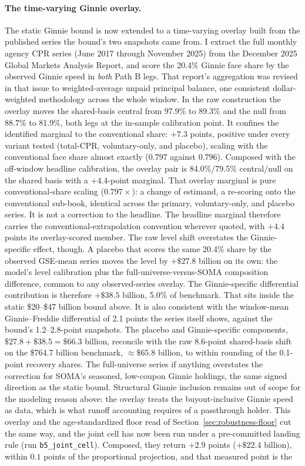 \documentclass[12pt]{article}
\begin{document}
\paragraph{The time-varying Ginnie overlay.}
The static Ginnie bound is now extended to a time-varying overlay built from the published series the bound's two snapshots came from. I extract the full monthly agency CPR series (June 2017 through November 2025) from the December 2025 Global Markets Analysis Report, and score the 20.4\% Ginnie face share by the observed Ginnie speed in \emph{both} Path B legs. That report's aggregation was revised in that issue to weighted-average unpaid principal balance, one consistent dollar-weighted methodology across the whole window. In the raw construction the overlay moves the shared-basis central from 97.9\% to 89.3\% and the null from 88.7\% to 81.9\%, both legs at the in-sample calibration point. It confines the identified marginal to the conventional share: $+7.3$ points, positive under every variant tested (total-CPR, voluntary-only, and placebo), scaling with the conventional face share almost exactly ($0.797$ against $0.796$). Composed with the off-window headline calibration, the overlay pair is 84.0\%/79.5\% central/null on the shared basis with a $+4.4$-point marginal. That overlay marginal is pure conventional-share scaling ($0.797\times$): a change of estimand, a re-scoring onto the conventional sub-book, identical across the primary, voluntary-only, and placebo series. It is not a correction to the headline. The headline marginal therefore carries the conventional-extrapolation convention wherever quoted, with $+4.4$ points its overlay-scored member. The raw level shift overstates the Ginnie-specific effect, though. A placebo that scores the same 20.4\% share by the observed GSE-mean series moves the level by $+\$27.8$ billion on its own: the model's level calibration plus the full-universe-versus-SOMA composition difference, common to any observed-series overlay. The Ginnie-specific differential contribution is therefore $+\$38.5$ billion, 5.0\% of benchmark. That sits inside the static \$20--\$47 billion bound above. It is also consistent with the window-mean Ginnie--Freddie differential of 2.1 points the series itself shows, against the bound's 1.2--2.8-point snapshots. The placebo and Ginnie-specific components, $\$27.8 + \$38.5 = \$66.3$ billion, reconcile with the raw 8.6-point shared-basis shift on the \$764.7 billion benchmark, $\approx\$65.8$ billion, to within rounding of the 0.1-point recovery shares. The full-universe series if anything overstates the correction for SOMA's seasoned, low-coupon Ginnie holdings, the same signed direction as the static bound. Structural Ginnie inclusion remains out of scope for the modeling reason above: the overlay treats the buyout-inclusive Ginnie speed as data, which is what runoff accounting requires of a passthrough holder. This overlay and the age-standardized floor read of Section~\ref{sec:robustness-floor} cut the same way, and the joint cell has now been run under a pre-committed landing rule (run \texttt{b5\_joint\_cell}). Composed, they return $+2.9$ points ($+\$22.4$ billion), within $0.1$ points of the proportional projection, and that measured point is the 
\end{document}
